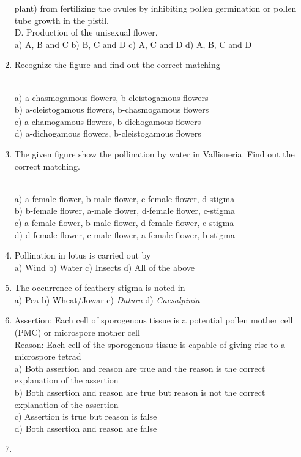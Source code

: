 \begin{enumerate}
  plant) from fertilizing the ovules by inhibiting pollen germination or
  pollen tube growth in the pistil.\\
  D. Production of the unisexual flower.\\
  a) A, B and C b) B, C and D c) A, C and D d) A, B, C and D
\item
  Recognize the figure and find out the correct matching\\
  \strut \\
  a) a-chasmogamous flowers, b-cleistogamous flowers\\
  b) a-cleistogamous flowers, b-chasmogamous flowers\\
  c) a-chamogamous flowers, b-dichogamous flowers\\
  d) a-dichogamous flowers, b-cleistogamous flowers
\item
  The given figure show the pollination by water in Vallisneria. Find
  out the correct matching.\\
  \strut \\
  a) a-female flower, b-male flower, c-female flower, d-stigma\\
  b) b-female flower, a-male flower, d-female flower, c-stigma\\
  c) a-female flower, b-male flower, d-female flower, c-stigma\\
  d) d-female flower, c-male flower, a-female flower, b-stigma
\item
  Pollination in lotus is carried out by\\
  a) Wind b) Water c) Insects d) All of the above
\item
  The occurrence of feathery stigma is noted in\\
  a) Pea b) Wheat/Jowar c) \emph{Datura} d) \emph{Caesalpinia}
\item
  Assertion: Each cell of sporogenous tissue is a potential pollen
  mother cell (PMC) or microspore mother cell\\
  Reason: Each cell of the sporogenous tissue is capable of giving rise
  to a microspore tetrad\\
  a) Both assertion and reason are true and the reason is the correct
  explanation of the assertion\\
  b) Both assertion and reason are true but reason is not the correct
  explanation of the assertion\\
  c) Assertion is true but reason is false\\
  d) Both assertion and reason are false
\item

\end{enumerate}
